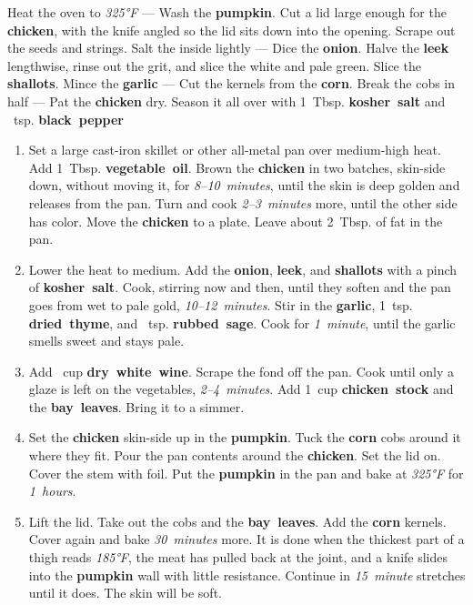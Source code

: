 \documentclass[11pt,letterpaper]{article}
\begin{document}
\noindent
Heat the oven to \textit{325°F} ---
Wash the \textbf{pumpkin}. Cut a lid large enough for the \textbf{chicken}, with the knife angled so the lid sits down into the opening. Scrape out the seeds and strings. Salt the inside lightly ---
Dice the \textbf{onion}. Halve the \textbf{leek} lengthwise, rinse out the grit, and slice the white and pale green. Slice the \textbf{shallots}. Mince the \textbf{garlic} ---
Cut the kernels from the \textbf{corn}. Break the cobs in half ---
Pat the \textbf{chicken} dry. Season it all over with 1~Tbsp. \textbf{kosher~salt} and ~tsp. \textbf{black~pepper}

\begin{enumerate}
    \item Set a large cast-iron skillet or other all-metal pan over medium-high heat. Add 1~Tbsp. \textbf{vegetable~oil}. Brown the \textbf{chicken} in two batches, skin-side down, without moving it, for \textit{8--10~minutes}, until the skin is deep golden and releases from the pan. Turn and cook \textit{2--3~minutes} more, until the other side has color. Move the \textbf{chicken} to a plate. Leave about 2~Tbsp. of fat in the pan.

    \item Lower the heat to medium. Add the \textbf{onion}, \textbf{leek}, and \textbf{shallots} with a pinch of \textbf{kosher~salt}. Cook, stirring now and then, until they soften and the pan goes from wet to pale gold, \textit{10--12~minutes}. Stir in the \textbf{garlic}, 1~tsp. \textbf{dried~thyme}, and ~tsp. \textbf{rubbed~sage}. Cook for \textit{1~minute}, until the garlic smells sweet and stays pale.

    \item Add ~cup \textbf{dry~white~wine}. Scrape the fond off the pan. Cook until only a glaze is left on the vegetables, \textit{2--4~minutes}. Add 1~cup \textbf{chicken~stock} and the \textbf{bay~leaves}. Bring it to a simmer.

    \item Set the \textbf{chicken} skin-side up in the \textbf{pumpkin}. Tuck the \textbf{corn} cobs around it where they fit. Pour the pan contents around the \textbf{chicken}. Set the lid on. Cover the stem with foil. Put the \textbf{pumpkin} in the pan and bake at \textit{325°F} for \textit{1~hours}.

    \item Lift the lid. Take out the cobs and the \textbf{bay~leaves}. Add the \textbf{corn} kernels. Cover again and bake \textit{30~minutes} more. It is done when the thickest part of a thigh reads \textit{185°F}, the meat has pulled back at the joint, and a knife slides into the \textbf{pumpkin} wall with little resistance. Continue in \textit{15~minute} stretches until it does. The skin will be soft.


\end{enumerate}
\end{document}

